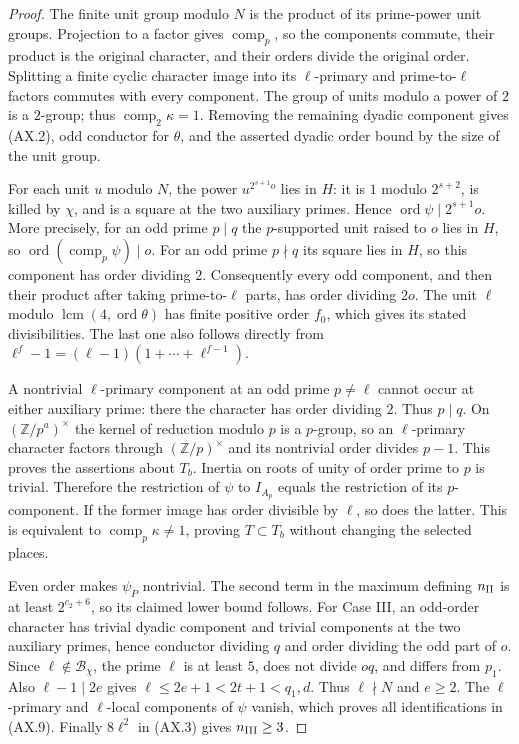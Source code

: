 \begin{proof}
The finite unit group modulo $N$ is the product of its prime-power
unit groups.  Projection to a factor gives
$\operatorname{comp}_p$, so the components commute, their product
is the original character, and their orders divide the original
order.  Splitting a finite cyclic character image into its
$\ell$-primary and prime-to-$\ell$ factors commutes with every
component.  The group of units modulo a power of $2$ is a $2$-group;
thus $\operatorname{comp}_2\kappa=1$.  Removing the remaining dyadic
component gives (AX.2), odd conductor for $\theta$, and the asserted
dyadic order bound by the size of the unit group.

For each unit $u$ modulo $N$, the power $u^{2^{s+1}o}$ lies in $H$:
it is $1$ modulo $2^{s+2}$, is killed by $\chi$, and is a square
at the two auxiliary primes.  Hence
$\operatorname{ord}\psi\mid2^{s+1}o$.  More precisely, for an odd
prime $p\mid q$ the $p$-supported unit raised to $o$ lies in $H$,
so $\operatorname{ord}(\operatorname{comp}_p\psi)\mid o$.
For an odd prime $p\nmid q$ its square lies in $H$, so this
component has order dividing $2$.  Consequently every odd
component, and then their product after taking prime-to-$\ell$
parts, has order dividing $2o$.  The unit $\ell$ modulo
$\operatorname{lcm}(4,\operatorname{ord}\theta)$ has finite positive
order $f_0$, which gives its stated divisibilities.  The last one
also follows directly from $\ell^f-1=(\ell-1)(1+\cdots+\ell^{f-1})$.

A nontrivial $\ell$-primary component at an odd prime $p\ne\ell$
cannot occur at either auxiliary prime: there the character has
order dividing $2$.  Thus $p\mid q$.  On
$(\mathbb Z/p^a)^\times$ the kernel of reduction modulo $p$ is
a $p$-group, so an $\ell$-primary character factors through
$(\mathbb Z/p)^\times$ and its nontrivial order divides $p-1$.
This proves the assertions about $T_b$.  Inertia on roots of unity
of order prime to $p$ is trivial.  Therefore the restriction of
$\psi$ to $I_{A_p}$ equals the restriction of its $p$-component.
If the former image has order divisible by $\ell$, so does the
latter.  This is equivalent to
$\operatorname{comp}_p\kappa\ne1$, proving $T\subset T_b$ without
changing the selected places.

Even order makes $\psi_P$ nontrivial.  The second term in the
maximum defining $n_{\rm II}$ is at least $2^{c_2+6}$, so its
claimed lower bound follows.  For Case III, an odd-order character
has trivial dyadic component and trivial components at the two
auxiliary primes, hence conductor dividing $q$ and order dividing
the odd part of $o$.  Since $\ell\notin\mathcal B_\chi$, the
prime $\ell$ is at least $5$, does not divide $oq$, and differs
from $p_{\!1}$.  Also $\ell-1\mid2e$ gives
$\ell\le2e+1<2t+1<q_1,d$.  Thus $\ell\nmid N$ and $e\ge2$.
The $\ell$-primary and $\ell$-local components of $\psi$ vanish,
which proves all identifications in (AX.9).  Finally $8\ell^2$
in (AX.3) gives $n_{\rm III}\ge3$.


\end{proof}
